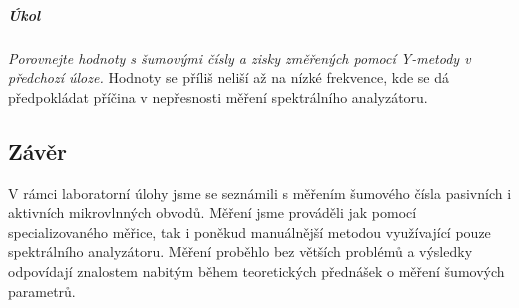 \documentclass[11pt,a4paper]{article}
\begin{document}
\subparagraph*{Úkol} \emph{Porovnejte hodnoty s šumovými čísly a zisky změřených pomocí Y-metody v předchozí úloze.} Hodnoty se příliš neliší až na nízké frekvence, kde se dá předpokládat příčina v nepřesnosti měření spektrálního analyzátoru.

\subsection*{Závěr}
V rámci laboratorní úlohy jsme se seznámili s měřením šumového čísla pasivních i aktivních mikrovlnných obvodů. Měření jsme prováděli jak pomocí specializovaného měřice, tak i poněkud manuálnější metodou využívající pouze spektrálního analyzátoru. Měření proběhlo bez větších problémů a výsledky odpovídají znalostem nabitým během teoretických přednášek o měření šumových parametrů.
\end{document}
